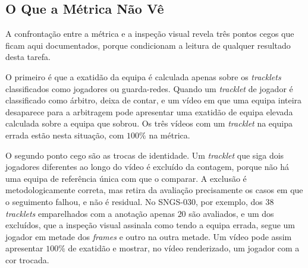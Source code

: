 \subsection{O Que a Métrica Não Vê}\label{sec:res_equipa_metrica}

A confrontação entre a métrica e a inspeção visual revela três pontos cegos que ficam aqui documentados, porque condicionam a leitura de qualquer resultado desta tarefa.

O primeiro é que a exatidão da equipa é calculada apenas sobre os \emph{tracklets} classificados como jogadores ou guarda-redes. Quando um \emph{tracklet} de jogador é classificado como árbitro, deixa de contar, e um vídeo em que uma equipa inteira desaparece para a arbitragem pode apresentar uma exatidão de equipa elevada calculada sobre a equipa que sobrou. Os três vídeos com um \emph{tracklet} na equipa errada estão nesta situação, com $100\%$ na métrica.

O segundo ponto cego são as trocas de identidade. Um \emph{tracklet} que siga dois jogadores diferentes ao longo do vídeo é excluído da contagem, porque não há uma equipa de referência única com que o comparar. A exclusão é metodologicamente correta, mas retira da avaliação precisamente os casos em que o seguimento falhou, e não é residual. No SNGS-030, por exemplo, dos $38$ \emph{tracklets} emparelhados com a anotação apenas $20$ são avaliados, e um dos excluídos, que a inspeção visual assinala como tendo a equipa errada, segue um jogador em metade dos \emph{frames} e outro na outra metade. Um vídeo pode assim apresentar $100\%$ de exatidão e mostrar, no vídeo renderizado, um jogador com a cor trocada.

